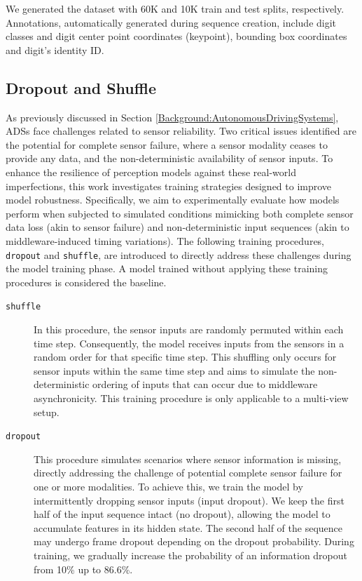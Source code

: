 We generated the dataset with 60K and 10K train and test splits, respectively. Annotations, automatically generated during sequence creation, include digit classes and digit center point coordinates (keypoint), bounding box coordinates and digit's identity ID.

\subsection{Dropout and Shuffle} \label{Methods:DropoutAndShuffle}

As previously discussed in Section \ref{Background:AutonomousDrivingSystems}, ADSs face challenges related to sensor reliability. Two critical issues identified are the potential for complete sensor failure, where a sensor modality ceases to provide any data, and the non-deterministic availability of sensor inputs. To enhance the resilience of perception models against these real-world imperfections, this work investigates training strategies designed to improve model robustness. Specifically, we aim to experimentally evaluate how models perform when subjected to simulated conditions mimicking both complete sensor data loss (akin to sensor failure) and non-deterministic input sequences (akin to middleware-induced timing variations). The following training procedures, \texttt{dropout} and \texttt{shuffle}, are introduced to directly address these challenges during the model training phase. A model trained without applying these training procedures is considered the baseline.

\begin{description}
    \item[\texttt{shuffle}] In this procedure, the sensor inputs are randomly permuted within each time step. Consequently, the model receives inputs from the sensors in a random order for that specific time step. This shuffling only occurs for sensor inputs within the same time step and aims to simulate the non-deterministic ordering of inputs that can occur due to middleware asynchronicity. This training procedure is only applicable to a multi-view setup.

    \item[\texttt{dropout}] This procedure simulates scenarios where sensor information is missing, directly addressing the challenge of potential complete sensor failure for one or more modalities. To achieve this, we train the model by intermittently dropping sensor inputs (input dropout). We keep the first half of the input sequence intact (no dropout), allowing the model to accumulate features in its hidden state. The second half of the sequence may undergo frame dropout depending on the dropout probability. During training, we gradually increase the probability of an information dropout from 10\% up to 86.6\%.
\end{description}

